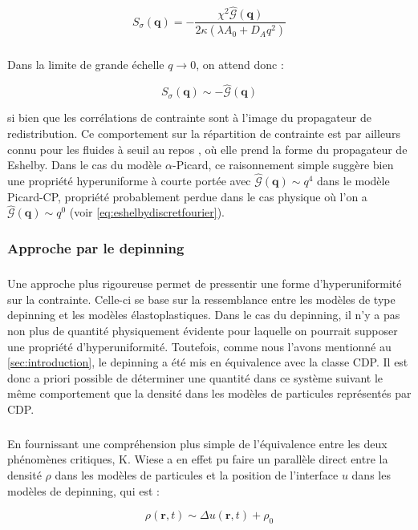 \begin{equation}
    S_{\sigma}(\mathbf{q}) = -\frac{\chi^2\hat{\mathcal{G}}(\bm{q})}{2\kappa(\lambda A_0 + D_A q^2)}
\end{equation}

\subparagraph{}Dans la limite de grande échelle $q\rightarrow 0$, on attend donc :

\begin{equation}
    S_{\sigma}(\mathbf{q}) \sim -\hat{\mathcal{G}}(\bm{q})
\end{equation}

\noindent si bien que les corrélations de contrainte sont à l'image du propagateur de redistribution. Ce comportement sur la répartition de contrainte est par ailleurs connu pour les fluides à seuil au repos \cite{lerner_simple_2020}, où elle prend la forme du propagateur de Eshelby. Dans le cas du modèle $\alpha$-Picard, ce raisonnement simple suggère bien une propriété hyperuniforme à courte portée avec $\hat{\mathcal{G}}(\bm{q})\sim q^4$ dans le modèle Picard-CP, propriété probablement perdue dans le cas physique où l'on a $\hat{\mathcal{G}}(\bm{q})\sim q^0$ (voir \autoref{eq:eshelbydiscretfourier}).

\subsubsection{Approche par le depinning}

\subparagraph{}Une approche plus rigoureuse permet de pressentir une forme d'hyperuniformité sur la contrainte. Celle-ci se base sur la ressemblance entre les modèles de type depinning et les modèles élastoplastiques. Dans le cas du depinning, il n'y a pas non plus de quantité physiquement évidente pour laquelle on pourrait supposer une propriété d'hyperuniformité. Toutefois, comme nous l'avons mentionné au \autoref{sec:introduction}, le depinning a été mis en équivalence avec la classe CDP. Il est donc a priori possible de déterminer une quantité dans ce système suivant le même comportement que la densité dans les modèles de particules représentés par CDP. 

\subparagraph{}En fournissant une compréhension plus simple de l'équivalence entre les deux phénomènes critiques, K. Wiese \cite{wiese_hyperuniformity_2024} a en effet pu faire un parallèle direct entre la densité $\rho$ dans les modèles de particules et la position de l'interface $u$ dans les modèles de depinning, qui est :

\begin{equation}
	\rho(\mathbf{r},t) \sim \Delta u(\mathbf{r},t) + \rho_0
\end{equation}

